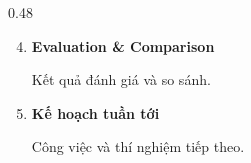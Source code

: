 \begin{frame}
\begin{columns}[T,onlytextwidth]
\begin{column}{0.48\textwidth}
            \vspace{0.2cm}

            \begin{enumerate}
                \setcounter{enumi}{3}

                \item \textbf{Evaluation \& Comparison}

                {\small Kết quả đánh giá và so sánh.}

                \vspace{0.25cm}

                \item \textbf{Kế hoạch tuần tới}

                {\small Công việc và thí nghiệm tiếp theo.}
            \end{enumerate}
        \end{column}

    \end{columns}

\end{frame}
